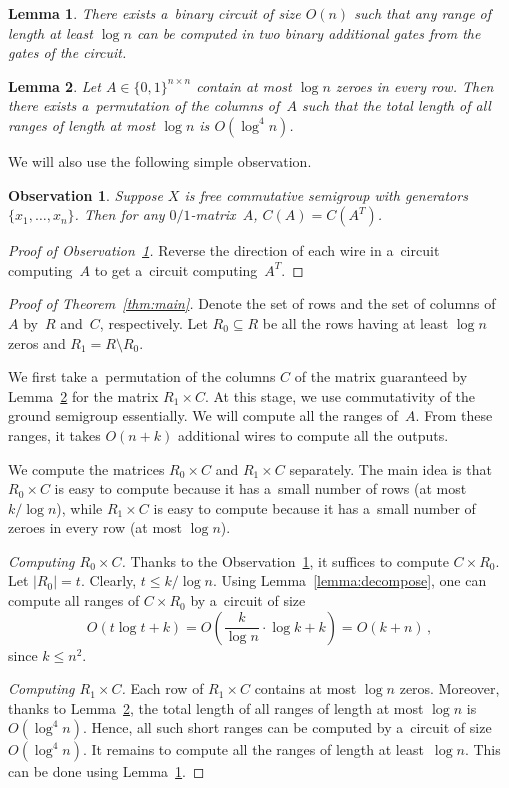 \documentclass[11pt,letterpaper]{article}
\newtheorem{lemma}{Lemma}
\newtheorem{observation}{Observation}
\begin{document}
\begin{lemma}\label{lemma:blocks}
There exists a~binary circuit of size $O(n)$ such that any range
of length at least $\log n$ can be computed in two binary
additional gates from the gates of the circuit.
\end{lemma}

\begin{lemma}\label{lemma:permute}
Let $A \in \{0,1\}^{n \times n}$ contain at most $\log n$ zeroes in
every row. Then there exists a~permutation of the columns of~$A$
such that the total length of all ranges of length
at most $\log n$ is $O(\log^4 n)$.
\end{lemma}

We will also use the following simple observation.

\begin{observation}\label{obs:transpose}
Suppose $X$ is free commutative semigroup with generators $\{x_1,\ldots, x_n\}$.
Then for any $0/1$-matrix~$A$, $C(A)=C(A^T)$.
\end{observation}
\begin{proof}[Proof of Observation~\ref{obs:transpose}]
Reverse the direction of each wire in a~circuit computing~$A$ to get a~circuit
computing~$A^T$.
\end{proof}

\begin{proof}[Proof of Theorem~\ref{thm:main}]
Denote the set of rows and the set of columns of~$A$ by~$R$
and~$C$, respectively. Let $R_0 \subseteq R$ be all the rows
having at least $\log n$ zeros and $R_1=R \setminus R_0$.

We first take a~permutation of the columns $C$ of the matrix
guaranteed by Lemma~\ref{lemma:permute} for the matrix $R_1 \times C$. At this stage,
we use commutativity of the ground semigroup essentially.
We will compute all the ranges of~$A$. From these ranges,
it takes $O(n+k)$ additional wires to compute all the outputs.

We
compute the matrices $R_0 \times C$ and $R_1 \times C$
separately. The main idea is that $R_0 \times C$ is easy to compute
because it has a~small number of rows (at most $k/\log n$), while $R_1 \times C$
is easy to compute because it has a~small number of zeroes in every row (at most
$\log n$).

\emph{Computing $R_0 \times C$.} Thanks to the Observation~\ref{obs:transpose},
it suffices to compute $C \times R_0$.
Let $|R_0|=t$. Clearly, $t \le k/\log n$.
Using Lemma~\ref{lemma:decompose}, one can compute all
ranges of $C \times R_0$ by a~circuit of size
\[O(t\log t+k)=O\left(\frac{k}{\log n} \cdot \log k+k\right)=O(k+n)\, ,\]
since $k \le n^2$.

\emph{Computing $R_1 \times C$.} Each row of
$R_1 \times C$ contains at most $\log n$ zeros. Moreover,
thanks to Lemma~\ref{lemma:permute}, the total length of all
ranges of length at most $\log n$ is $O(\log^4n)$. Hence, all
such short ranges can be computed by a~circuit of size~
$O(\log^4n)$. It remains to compute all the ranges of
length at least~$\log n$. This can be done using Lemma~\ref{lemma:blocks}.
\end{proof}
\end{document}
